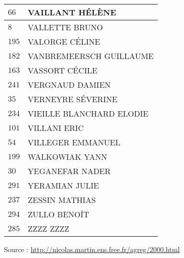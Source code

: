 \begin{xltabular}{\linewidth}{|l|X|}
    \hline
    $66$ & VAILLANT HÉLÈNE \\
    \hline
    $8$ & VALLETTE BRUNO \\
    \hline
    $195$ & VALORGE CÉLINE \\
    \hline
    $182$ & VANBREMEERSCH GUILLAUME \\
    \hline
    $163$ & VASSORT CÉCILE \\
    \hline
    $241$ & VERGNAUD DAMIEN \\
    \hline
    $35$ & VERNEYRE SÉVERINE \\
    \hline
    $234$ & VIEILLE BLANCHARD ELODIE \\
    \hline
    $101$ & VILLANI ERIC \\
    \hline
    $54$ & VILLEGER EMMANUEL \\
    \hline
    $199$ & WALKOWIAK YANN \\
    \hline
    $30$ & YEGANEFAR NADER \\
    \hline
    $291$ & YERAMIAN JULIE \\
    \hline
    $237$ & ZESSIN MATHIAS \\
    \hline
    $294$ & ZULLO BENOÎT \\
    \hline
    $285$ & ZZZZ ZZZZ \\
    \hline
  \end{xltabular}

  \begin{flushright}
    {\tiny Source : \url{http://nicolas.martin.ens.free.fr/agreg/2000.html}}
  \end{flushright}

